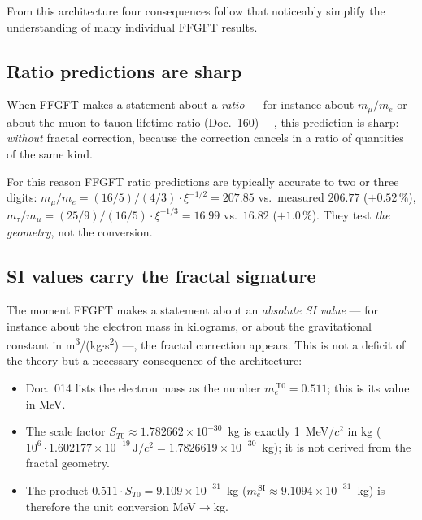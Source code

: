 From this architecture four consequences follow that noticeably
simplify the understanding of many individual FFGFT results.

\subsection{Ratio predictions are sharp}

When FFGFT makes a statement about a \emph{ratio} --- for instance
about $m_{\mu}/m_{e}$ or about the muon-to-tauon lifetime ratio
(Doc.~160) ---, this prediction is sharp: \emph{without} fractal
correction, because the correction cancels in a ratio of quantities of
the same kind.

\begin{center}
\end{center}

For this reason FFGFT ratio predictions are typically accurate to
two or three digits: $m_\mu/m_e = (16/5)/(4/3)\cdot\xi^{-1/2} = 207.85$
vs.\ measured $206.77$ ($+0.52\,\%$), $m_\tau/m_\mu =
(25/9)/(16/5)\cdot\xi^{-1/3} = 16.99$ vs.\ $16.82$ ($+1.0\,\%$). They
test \emph{the geometry}, not the conversion.

\subsection{SI values carry the fractal signature}

The moment FFGFT makes a statement about an \emph{absolute SI value}
--- for instance about the electron mass in kilograms, or about the
gravitational constant in m\textsuperscript{3}/(kg$\cdot$s\textsuperscript{2})
---, the fractal correction appears. This is not a deficit of the
theory but a necessary consequence of the architecture:

\begin{itemize}\setlength\itemsep{0pt}
  \item Doc.~014 lists the electron mass as the number
        $m_{e}^{\,\mathrm{T0}} = 0.511$; this is its value in MeV.
  \item The scale factor $S_{T0} \approx 1.782662\times 10^{-30}$~kg
        is exactly 1~MeV/$c^2$ in kg
        ($10^6\cdot1.602177\times10^{-19}\,\text{J}/c^2 = 1.7826619\times10^{-30}$~kg);
        it is not derived from the fractal geometry.
  \item The product $0.511\cdot S_{T0} = 9.109\times10^{-31}$~kg
        ($m_{e}^{\,\mathrm{SI}} \approx 9.1094 \times 10^{-31}$~kg) is
        therefore the unit conversion MeV$\to$kg.
\end{itemize}

